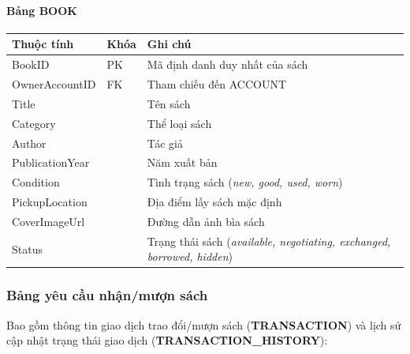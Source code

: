 \paragraph{Bảng BOOK}
{\small
\begin{longtable}{L{0.28\textwidth}L{0.12\textwidth}L{0.52\textwidth}}
\toprule
\textbf{Thuộc tính} & \textbf{Khóa} & \textbf{Ghi chú} \\
\midrule
BookID & PK & Mã định danh duy nhất của sách \\
OwnerAccountID & FK & Tham chiếu đến ACCOUNT \\
Title & & Tên sách \\
Category & & Thể loại sách \\
Author & & Tác giả \\
PublicationYear & & Năm xuất bản \\
Condition & & Tình trạng sách (\textit{new, good, used, worn}) \\
PickupLocation & & Địa điểm lấy sách mặc định \\
CoverImageUrl & & Đường dẫn ảnh bìa sách \\
Status & & Trạng thái sách (\textit{available, negotiating, exchanged, borrowed, hidden}) \\
\bottomrule
\end{longtable}
}

\subsubsection{Bảng yêu cầu nhận/mượn sách}

Bao gồm thông tin giao dịch trao đổi/mượn sách (\textbf{TRANSACTION}) và lịch sử cập nhật trạng thái giao dịch (\textbf{TRANSACTION\_HISTORY}):

